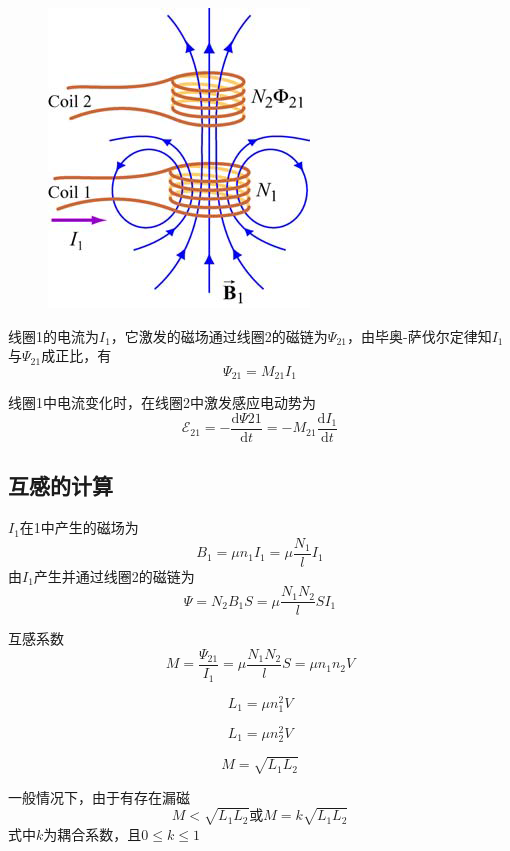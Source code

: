 \documentclass[12pt]{article}
\newcommand{\rmd}{\mathrm{d}}
\newcommand{\deriv}[2]{\frac{\rmd #1}{\rmd #2}}
\begin{document}
\begin{figure}[!h]
    \centering
    \includegraphics[width = .2\textwidth]{graphics/互感.png}
\end{figure}

线圈1的电流为\(I_1\)，它激发的磁场通过线圈2的磁链为\(\varPsi_{21}\)，由毕奥-萨伐尔定律知\(I_1\)与\(\varPsi_{21}\)成正比，有
\begin{equation}
    \varPsi_{21} = M_{21} I_1
\end{equation}

线圈1中电流变化时，在线圈2中激发感应电动势为
\begin{equation}
    \mathscr{E}_{21} = - \deriv{\varPsi{21}}{t} = -M_{21} \deriv{I_1}{t}
\end{equation}

\subsection{互感的计算}

\(I_1\)在1中产生的磁场为
\begin{equation}
    B_1 = \mu n_1 I_1 = \mu \frac{N_1}{l} I_1
\end{equation}
由\(I_1\)产生并通过线圈2的磁链为
\begin{equation}
    \varPsi = N_2 B_1 S = \mu \frac{N_1 N_2}{l} S I_1
\end{equation}

互感系数
\begin{equation}
    M = \frac{\varPsi_{21}}{I_1} = \mu \frac{N_1 N_2}{l} S = \mu n_1 n_2 V
\end{equation}

\begin{equation}
    L_1 = \mu n_1^2 V
\end{equation}

\begin{equation}
    L_1 = \mu n_2^2 V
\end{equation}

\begin{equation}
    M = \sqrt{L_1 L_2}
\end{equation}

一般情况下，由于有存在漏磁
\begin{equation}
    M < \sqrt{L_1 L_2} \text{或} M = k \sqrt{L_1 L_2}
\end{equation}
式中\(k\)为耦合系数，且\(0 \leq k \leq 1\)
\end{document}
